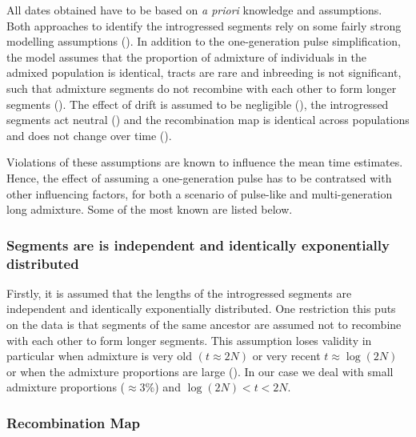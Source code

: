 \documentclass[]{article}
\begin{document}
All dates obtained have to be based on \emph{a priori} knowledge and
assumptions. Both approaches to identify the introgressed segments rely
on some fairly strong modelling assumptions
(\cite{pool_inference_2009,gravel_population_2012,liang_lengths_2014}).
In addition to the one-generation pulse simplification, the model assumes
that the proportion of admixture of individuals in the admixed
population is identical, tracts are rare and inbreeding is not
significant, such that admixture segments do not recombine with each
other to form longer segments (\cite{pool_inference_2009}). The effect
of drift is assumed to be negligible (\cite{loh_inferring_2013}), the
introgressed segments act neutral (\cite{shchur_distribution_2019}) and
the recombination map is identical across populations and does not
change over time (\cite{gravel_population_2012}).

Violations of these assumptions are known to influence the mean time
estimates. Hence, the effect of assuming a one-generation pulse has to
be contratsed with other influencing factors, for both a scenario of
pulse-like and multi-generation long admixture. Some of the most known
are listed below.

\subsubsection{Segments are is independent and identically exponentially
distributed}\label{segments-are-is-independent-and-identically-exponentially-distributed}

Firstly, it is assumed that the lengths of the introgressed segments are
independent and identically exponentially distributed. One restriction
this puts on the data is that segments of the same ancestor are assumed
not to recombine with each other to form longer segments. This
assumption loses validity in particular when admixture is very old
\((t \approx 2N)\) or very recent \(t \approx \log(2N)\) or when the
admixture proportions are large (\cite{liang_lengths_2014}). In our case
we deal with small admixture proportions (\(\approx3 \%\)) and
\(\log(2N) < t < 2N\).

\subsubsection{Recombination Map}\label{recombination-map}
\end{document}
